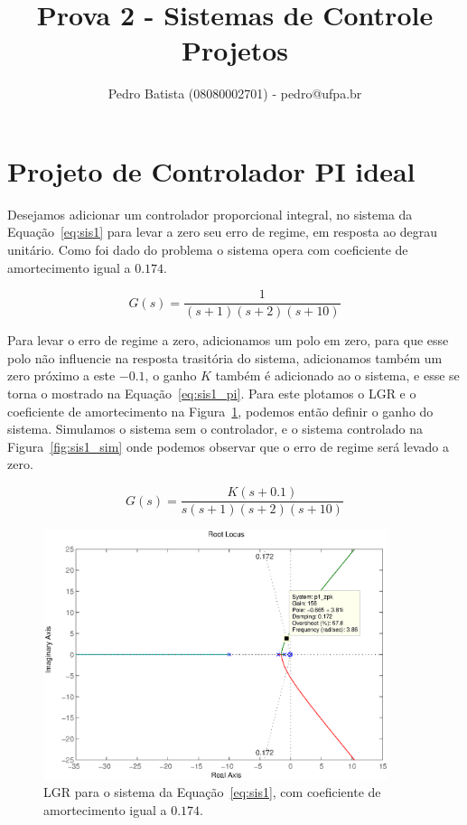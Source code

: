 \documentclass[a4paper]{article}
\title{Prova 2 - Sistemas de Controle Projetos}
\author{Pedro Batista (08080002701) - pedro@ufpa.br}
\begin{document}
\maketitle

\section{Projeto de Controlador PI ideal}\label{sec:pi_ideal}
Desejamos adicionar um controlador proporcional integral, no sistema
da Equação~\ref{eq:sis1} para levar a zero seu erro de regime, em
resposta ao degrau unitário. Como foi dado do problema o sistema
opera com coeficiente de amortecimento igual a $0.174$.

\begin{equation}
G(s)=\frac{1}{(s+1)(s+2)(s+10)}
\label{eq:sis1}
\end{equation}

Para levar o erro de regime a zero, adicionamos um polo em zero,
para que esse polo não influencie na resposta trasitória do sistema,
adicionamos também um zero próximo a este $-0.1$, o ganho $K$ também
é adicionado ao o sistema, e esse se torna
o mostrado na Equação~\ref{eq:sis1_pi}. Para este plotamos o LGR
e o coeficiente de amortecimento na Figura~\ref{fig:lgr_sis1},
podemos então definir o ganho do sistema. Simulamos
o sistema sem o controlador, e o sistema controlado na Figura~\ref{fig:sis1_sim}
onde podemos observar que o erro de regime será levado a zero.

\begin{equation}
G(s)=\frac{K(s+0.1)}{s(s+1)(s+2)(s+10)}
\label{eq:sis1_pi}
\end{equation}

\begin{figure}[ht]
   \centering
   \includegraphics[width=0.9\textwidth]{p1_lgr}
   \caption{LGR para o sistema da Equação~\ref{eq:sis1}, com
      coeficiente de amortecimento igual a $0.174$.}
   \label{fig:lgr_sis1}
\end{figure}
\end{document}
